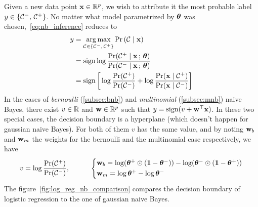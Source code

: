 Given a new data point $\mathbf{x} \in \mathbb{R}^p$, we wish to attribute it the most probable label
$y \in \left\{ \mathcal{C}^-,\, \mathcal{C}^+ \right\}$.
No matter what model parametrized by $\bm{\theta}$ was chosen,~\ref{eq:nb_inference} reduces to
\begin{align*}
    y &= \underset{\mathcal{C} \in \left\{ \mathcal{C}^-,\, \mathcal{C}^+ \right\}}{\operatorname*{arg\,max}} \Pr\left( \mathcal{C} \mid \mathbf{x} \right)\\
    &= \operatorname*{sign} \log \frac{\Pr(\mathcal{C}^+ \mid \mathbf{x} \,;\,\bm{\theta})}{\Pr(\mathcal{C}^- \mid \mathbf{x} \,;\,\bm{\theta})}\\
    &= \operatorname*{sign}\bigg[\log \frac{\Pr(\mathcal{C}^+)}{\Pr(\mathcal{C}^-)}
            + \log \frac{\Pr(\mathbf{x} \mid \mathcal{C}^+)}{\Pr(\mathbf{x} \mid \mathcal{C}^-)}\bigg]
\end{align*}
In the cases of \emph{bernoulli} (\ref{subsec:bnb}) and \emph{multinomial} (\ref{subsec:mnb}) naive Bayes,
there exist $v \in \mathbb{R}$ and $\mathbf{w} \in \mathbb{R}^p$ such that $y = \operatorname*{sign}(v + \mathbf{w}^\top\mathbf{x})$.
In these two special cases, the decision boundary is a hyperplane (which doesn't happen for gaussian naive Bayes).
For both of them $v$ has the same value, and by noting $\mathbf{w}_b$ and $\mathbf{w}_m$ the weights for the bernoulli
and the multinomial case respectively, we have
\begin{equation*}
    v = \log\frac{\Pr(\cC^+)}{\Pr(\cC^-)}
    ,\qquad\quad
    \begin{cases*}
        \ww_b = \log(\btheta^+\odot(\1 - \btheta^-)) - \log(\btheta^-\odot(\1 - \btheta^+))\\
        \ww_m = \log\btheta^+ - \log\btheta^-
    \end{cases*}
\end{equation*}
The figure~\ref{fig:log_reg_nb_comparison} compares the decision boundary of logistic regression to the one
of gaussian naive Bayes.
